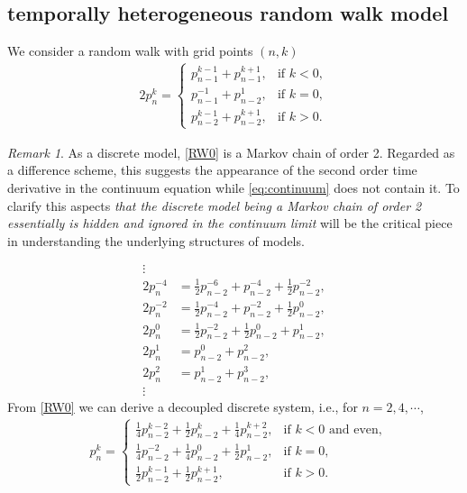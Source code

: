 \documentclass[a4paper,11pt]{article}
\def\blue{\color{blue}}
\theoremstyle{remark}
\newtheorem{remark}{Remark}[section]
\begin{document}
\subsection{temporally heterogeneous random walk model}
We consider a random walk with grid points $(n,k)$
\begin{equation} \label{RW0}\tag{RW0}
\begin{aligned}
    2p^k_n = \left\{\begin{array}{lr}
        p^{k-1} _{n-1} + p ^{k+1} _{n-1}, & \text{if } k<0,\\
        p^{-1} _{n-1} + p ^{1} _{n-2}, & \text{if } k=0,\\
        p^{k-1} _{n-2} + p ^{k+1} _{n-2}, & \text{if } k>0.
        \end{array}\right.
\end{aligned}
\end{equation}
\begin{remark}
 As a discrete model, \eqref{RW0} is a Markov chain {\blue of order 2}. Regarded as a difference scheme, this suggests the appearance of the second order time derivative in the continuum equation while \eqref{eq:continuum} does not contain it. To clarify this aspects  {\it that the discrete model being a Markov chain of order 2 essentially is hidden and ignored in the continuum limit} will be the critical piece in understanding the underlying structures of models.
\end{remark}
{\blue
\begin{equation*} %
\begin{aligned}
    \vdots &\\
    2p^{-4}_n &= \frac{1}{2}p^{-6} _{n-2} + p ^{-4} _{n-2} + \frac{1}{2} p^{-2}_{n-2},\\
    2p^{-2}_n &= \frac{1}{2}p^{-4} _{n-2} + p ^{-2} _{n-2} + \frac{1}{2} p^0_{n-2},\\
    2p^0_n &= \frac{1}{2}p^{-2} _{n-2} + \frac{1}{2}p^{0} _{n-2} + p ^{1} _{n-2},\\
    2p^1_n &= p^{0} _{n-2} + p ^{2} _{n-2},\\
    2p^2_n &= p^{1} _{n-2} + p ^{3} _{n-2},\\
    \vdots &
\end{aligned}
\end{equation*}
}
From \eqref{RW0} we can derive a decoupled discrete system, i.e., for $n=2,4,\cdots$,
\begin{equation} \label{RW1}\tag{RW1}
\begin{aligned}
    &p^{k}_n = \left\{\begin{array}{ll}
        \frac{1}{4}p^{k-2} _{n-2} + \frac{1}{2}p ^{k} _{n-2} + \frac{1}{4} p^{k+2}_{n-2}, & \text{if $k<0$ and even},\\
        \frac{1}{4}p^{-2} _{n-2} + \frac{1}{4}p^{0} _{n-2} + \frac{1}{2}p ^{1} _{n-2}, & \text{if $k=0$},\\
        \frac{1}{2}p^{k-1} _{n-2} + \frac{1}{2}p ^{k+1} _{n-2}, & \text{if } k>0.
        \end{array}\right. 
\end{aligned}
\end{equation}
\end{document}

